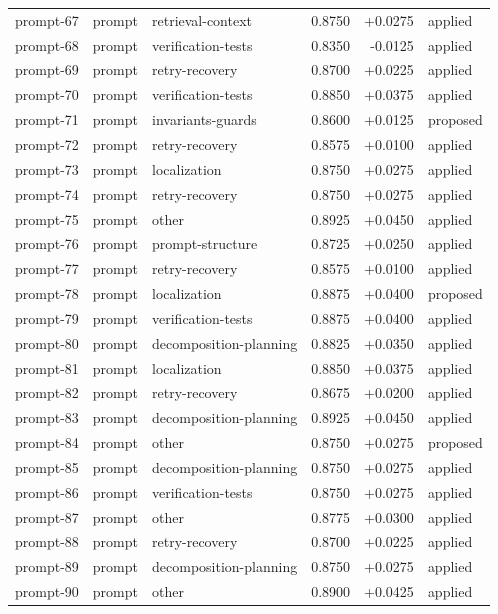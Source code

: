 \begin{center}
\begin{longtable}{llp{5.2cm}rrl}
prompt-67 & prompt & retrieval-context & 0.8750 & +0.0275 & applied \\
prompt-68 & prompt & verification-tests & 0.8350 & -0.0125 & applied \\
prompt-69 & prompt & retry-recovery & 0.8700 & +0.0225 & applied \\
prompt-70 & prompt & verification-tests & 0.8850 & +0.0375 & applied \\
prompt-71 & prompt & invariants-guards & 0.8600 & +0.0125 & proposed \\
prompt-72 & prompt & retry-recovery & 0.8575 & +0.0100 & applied \\
prompt-73 & prompt & localization & 0.8750 & +0.0275 & applied \\
prompt-74 & prompt & retry-recovery & 0.8750 & +0.0275 & applied \\
prompt-75 & prompt & other & 0.8925 & +0.0450 & applied \\
prompt-76 & prompt & prompt-structure & 0.8725 & +0.0250 & applied \\
prompt-77 & prompt & retry-recovery & 0.8575 & +0.0100 & applied \\
prompt-78 & prompt & localization & 0.8875 & +0.0400 & proposed \\
prompt-79 & prompt & verification-tests & 0.8875 & +0.0400 & applied \\
prompt-80 & prompt & decomposition-planning & 0.8825 & +0.0350 & applied \\
prompt-81 & prompt & localization & 0.8850 & +0.0375 & applied \\
prompt-82 & prompt & retry-recovery & 0.8675 & +0.0200 & applied \\
prompt-83 & prompt & decomposition-planning & 0.8925 & +0.0450 & applied \\
prompt-84 & prompt & other & 0.8750 & +0.0275 & proposed \\
prompt-85 & prompt & decomposition-planning & 0.8750 & +0.0275 & applied \\
prompt-86 & prompt & verification-tests & 0.8750 & +0.0275 & applied \\
prompt-87 & prompt & other & 0.8775 & +0.0300 & applied \\
prompt-88 & prompt & retry-recovery & 0.8700 & +0.0225 & applied \\
prompt-89 & prompt & decomposition-planning & 0.8750 & +0.0275 & applied \\
prompt-90 & prompt & other & 0.8900 & +0.0425 & applied \\

\end{longtable}
\end{center}

